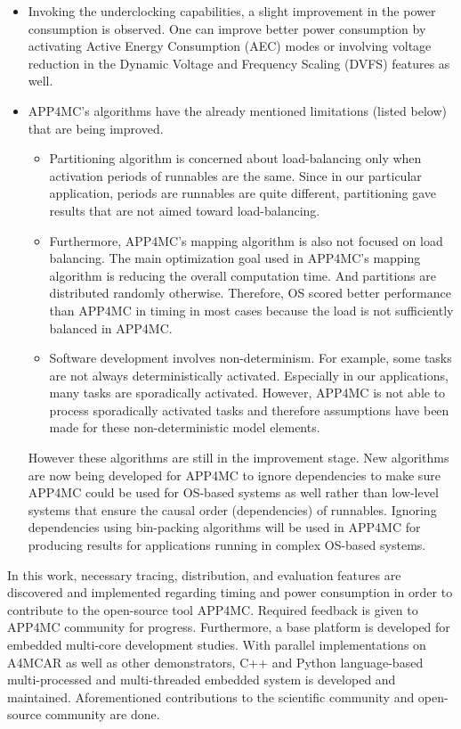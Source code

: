 \begin{itemize}
	\item Invoking the underclocking capabilities, a slight improvement in the power consumption is observed. One can improve better power consumption by activating Active Energy Consumption (AEC) modes or involving voltage reduction in the Dynamic Voltage and Frequency Scaling (DVFS) features as well.
	\item APP4MC's algorithms have the already mentioned limitations (listed below) that are being improved.
	\begin{itemize}
		\item Partitioning algorithm is concerned about load-balancing only when activation periods of runnables are the same. Since in our particular application, periods are runnables are quite different, partitioning gave results that are not aimed toward load-balancing.
		\item Furthermore, APP4MC's mapping algorithm is also not focused on load balancing. The main optimization goal used in APP4MC's mapping algorithm is reducing the overall computation time. And partitions are distributed randomly otherwise. Therefore, OS scored better performance than APP4MC in timing in most cases because the load is not sufficiently balanced in APP4MC.
		\item Software development involves non-determinism. For example, some tasks are not always deterministically activated. Especially in our applications, many tasks are sporadically activated. However, APP4MC is not able to process sporadically activated tasks and therefore assumptions have been made for these non-deterministic model elements.
	\end{itemize}
	 However these algorithms are still in the improvement stage. New algorithms are now being developed for APP4MC to ignore dependencies to make sure APP4MC could be used for OS-based systems as well rather than low-level systems that ensure the causal order (dependencies) of runnables. Ignoring dependencies using bin-packing algorithms will be used in APP4MC for producing results for applications running in complex OS-based systems.
\end{itemize}

In this work, necessary tracing, distribution, and evaluation features are discovered and implemented regarding timing and power consumption in order to contribute to the open-source tool APP4MC. Required feedback is given to APP4MC community for progress. Furthermore, a base platform is developed for embedded multi-core development studies. With parallel implementations on A4MCAR as well as other demonstrators, C++ and Python language-based multi-processed and multi-threaded embedded system is developed and maintained. Aforementioned contributions to the scientific community and open-source community are done.

